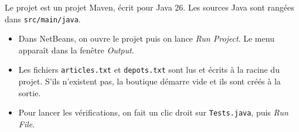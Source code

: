 \documentclass[11pt,a4paper]{article}
\newcommand{\code}[1]{\texttt{#1}}
\begin{document}
Le projet est un projet Maven, écrit pour Java 26. Les sources Java sont rangées dans
\code{src/main/java}.

\begin{itemize}
\item Dans NetBeans, on ouvre le projet puis on lance \emph{Run Project}. Le menu apparaît dans la
fenêtre \emph{Output}.
\item Les fichiers \code{articles.txt} et \code{depots.txt} sont lus et écrits à la racine du
projet. S'ils n'existent pas, la boutique démarre vide et ils sont créés à la sortie.
\item Pour lancer les vérifications, on fait un clic droit sur \code{Tests.java}, puis
\emph{Run File}.
\end{itemize}
\end{document}
